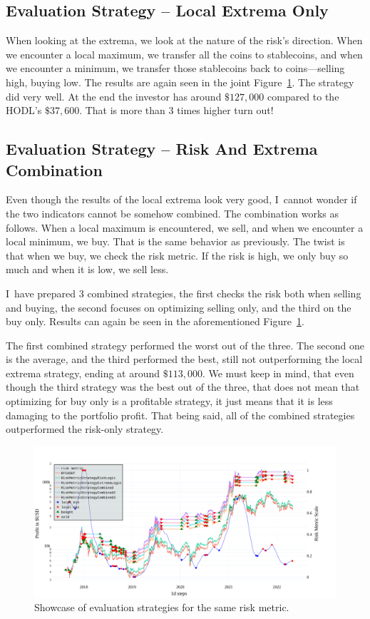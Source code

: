 \subsection*{Evaluation Strategy -- Local Extrema Only}
\label{subsection-local-extrema}
When looking at the extrema, we look at the nature of the risk's direction. When we encounter a local maximum, we transfer all the coins to stablecoins, and when we encounter a minimum, we transfer those stablecoins back to coins---selling high, buying low. The results are again seen in the joint Figure~\ref{figure-combined-riskmetric}. The strategy did very well. At the end the investor has around $\$127,000$ compared to the HODL's $\$37,600$. That is more than 3 times higher turn out!

\subsection*{Evaluation Strategy -- Risk And Extrema Combination}
Even though the results of the local extrema look very good, I~cannot wonder if the two indicators cannot be somehow combined. The combination works as follows. When a local maximum is encountered, we sell, and when we encounter a local minimum, we buy. That is the same behavior as previously. The twist is that when we buy, we check the risk metric. If the risk is high, we only buy so much and when it is low, we sell less.

I~have prepared 3 combined strategies, the first checks the risk both when selling and buying, the second focuses on optimizing selling only, and the third on the buy only. Results can again be seen in the aforementioned Figure~\ref{figure-combined-riskmetric}.

The first combined strategy performed the worst out of the three. The second one is the average, and the third performed the best, still not outperforming the local extrema strategy, ending at around $\$113,000$. We must keep in mind, that even though the third strategy was the best out of the three, that does not mean that optimizing for buy only is a profitable strategy, it just means that it is less damaging to the portfolio profit. That being said, all of the combined strategies outperformed the risk-only strategy.

\begin{figure}[!hbt]
    \centering
    \includegraphics[width=\columnwidth]{figures/combined-riskmetric.pdf}
    \caption{Showcase of evaluation strategies for the same risk metric.}
    \label{figure-combined-riskmetric}
\end{figure}

